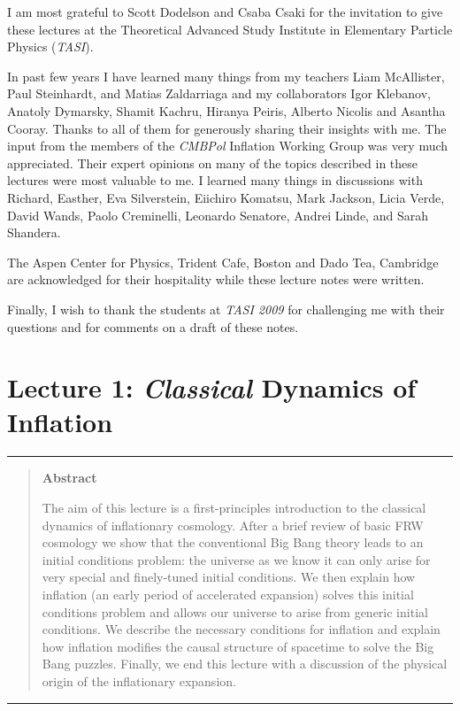 \documentclass[12pt,letterpaper,rotate]{article}
\begin{document}
{I am most grateful to Scott Dodelson and Csaba Csaki for the invitation to give these lectures at the Theoretical Advanced Study Institute in Elementary Particle Physics ({\sl TASI}).

In past few years I have learned many things from my teachers
Liam McAllister, Paul Steinhardt, and Matias Zaldarriaga
and my  collaborators Igor Klebanov, Anatoly Dymarsky, Shamit Kachru, Hiranya Peiris, Alberto Nicolis and Asantha Cooray.
Thanks to all of them for generously sharing their insights with me.
The input from the 
members of the {\sl CMBPol} Inflation Working Group \cite{WhitePaper} was very much appreciated.
Their expert opinions on many of the topics described in these lectures were most valuable to me.
I learned many things in discussions with Richard, Easther, Eva Silverstein, Eiichiro Komatsu, Mark Jackson, Licia Verde, David Wands, Paolo Creminelli, Leonardo Senatore, Andrei Linde, and Sarah Shandera.

The Aspen Center for Physics, Trident Cafe, Boston and Dado Tea, Cambridge are acknowledged for their hospitality while these lecture notes were written.

Finally, I wish to thank the students at {\sl TASI 2009} for challenging me with their questions and for comments on a draft of these notes.
\newpage
\part{Lecture 1: {\sl Classical} Dynamics of Inflation}

\vspace{0.5cm}
 \hrule \vspace{0.3cm}
\begin{quote}
{\bf Abstract}

\noindent
The aim of this lecture is a first-principles introduction to the classical dynamics of inflationary cosmology.
After a brief review of basic FRW cosmology we show that the conventional Big Bang theory leads to an initial conditions problem: the universe as we know it can only arise for very special and finely-tuned initial conditions. We then explain how inflation (an early period of accelerated expansion) solves this initial conditions problem and allows our universe to arise from generic initial conditions.
We describe the necessary conditions for inflation and explain how inflation modifies the causal structure of spacetime to solve the Big Bang puzzles.
Finally, we end this lecture with a discussion of the physical origin of the inflationary expansion. 
\end{quote}
\vspace{0.1cm}  \hrule
 \vspace{0.5cm}
 
}
\end{document}
